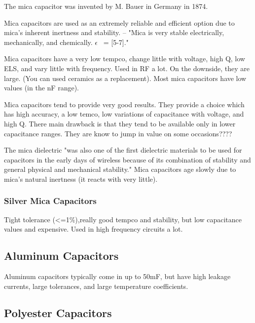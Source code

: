 The mica capacitor was invented by M. Bauer in Germany in 1874. 

Mica capacitors are used as an extremely reliable and efficient option due to mica's inherent inertness and stability. \cite{tedds_mica}    
--
"Mica is very stable electrically, mechanically, and chemically. $\epsilon$ ~= [5-7].\cite{uiowa_mica}"

Mica capacitors have a very low tempco, change little with voltage, high Q, low ELS, and vary little with frequency. Used in RF a lot. On the downside, they are large. (You can used ceramics as a replacement). Most mica capacitors have low values (in the nF range).\cite{uiowa_mica}

\nocite{hh_cap_table}
\nocite{capGuide_mica}

Mica capacitors tend to provide very good results. They provide a choice which has high accuracy, a low temco, low variations of capacitance with voltage, and high Q. There main drawback is that they tend to be available only in lower capacitance ranges. They are know to jump in value on some occasions???? 
\cite{radio_mica}

The mica dielectric "was also one of the first dielectric materials to be used for capacitors in the early days of wireless because of its combination of stability and general physical and mechanical stability." Mica capacitors age slowly due to mica's natural inertness (it reacts with very little).\cite{radio_mica}

\subsubsection{Silver Mica Capacitors}

Tight tolerance (<=1\%),really good tempco and stability, but low capacitance values and expensive. Used in high frequency circuits a lot.\cite{learn_caps}

\subsection{Aluminum Capacitors}

Aluminum capacitors typically come in up to 50mF, but have high leakage currents, large tolerances, and large temperature coefficients. \cite{learn_caps}

\subsection{Polyester Capacitors}

